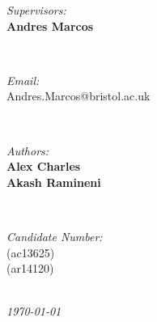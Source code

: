 \documentclass[11pt]{article}
\makeatletter
\newcommand{\StudentNameA}{Alex Charles}
\newcommand{\StudentNumberA}{ac13625}
\newcommand{\StudentNameB}{Akash Ramineni}
\newcommand{\StudentNumberB}{ar14120}
\newcommand{\SupervisorNameA}{Andres Marcos}
\newcommand{\SupervisorEmailA}{Andres.Marcos@bristol.ac.uk}
\newcommand{\SupervisorNameB}{Name}
\newcommand{\SupervisorEmailB}{email@gmail.com}
\makeatother
\begin{document}
\begin{titlepage}
\begin{minipage}{0.4\textwidth}
\begin{flushleft} \large
\emph{Supervisors:}\\
\textbf{\SupervisorNameA}\\
\end{flushleft}
\end{minipage}
~
\begin{minipage}{0.4\textwidth}
\begin{flushright} \large
\emph{Email:} \\
\SupervisorEmailA\\

\end{flushright}
\end{minipage}\\[1cm]

\begin{minipage}{0.4\textwidth}
\begin{flushleft} \large
\emph{Authors:}\\
	\textbf{\StudentNameA}\\
  \textbf{\StudentNameB}
\end{flushleft}
\end{minipage}
~
\begin{minipage}{0.4\textwidth}
\begin{flushright} \large
\emph{Candidate Number:} \\
(\StudentNumberA)\\
(\StudentNumberB)
\end{flushright}
\end{minipage}\\[2cm]

\textit{{\large \today}}\\[1cm] %
\vfill %
\end{titlepage}


\newpage


\end{document}
